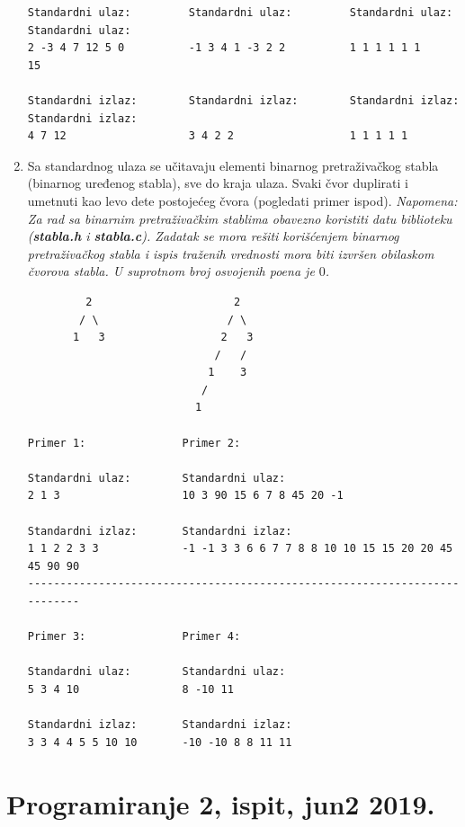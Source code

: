 \begin{enumerate}
\begin{verbatim}
Standardni ulaz:         Standardni ulaz:         Standardni ulaz:         Standardni ulaz:         
2 -3 4 7 12 5 0          -1 3 4 1 -3 2 2          1 1 1 1 1 1              15

Standardni izlaz:        Standardni izlaz:        Standardni izlaz:        Standardni izlaz:        
4 7 12                   3 4 2 2                  1 1 1 1 1
\end{verbatim}  

\item Sa standardnog ulaza se učitavaju elementi binarnog pretraživačkog stabla (binarnog uređenog stabla), 
      sve do kraja ulaza. Svaki čvor duplirati i umetnuti kao levo dete postojećeg čvora (pogledati primer ispod).
      \textit{Napomena: Za rad sa binarnim pretraživačkim stablima obavezno koristiti datu biblioteku (\textbf{stabla.h} i \textbf{stabla.c}). Zadatak se mora rešiti korišćenjem binarnog pretraživačkog stabla i ispis traženih vrednosti mora biti izvršen obilaskom čvorova stabla. U suprotnom broj osvojenih poena je $0$.}

\begin{verbatim}
         2                      2
        / \                    / \  
       1   3                  2   3
                             /   /
                            1    3 
                           /
                          1

Primer 1:               Primer 2:                

Standardni ulaz:        Standardni ulaz:         
2 1 3                   10 3 90 15 6 7 8 45 20 -1           

Standardni izlaz:       Standardni izlaz:        
1 1 2 2 3 3             -1 -1 3 3 6 6 7 7 8 8 10 10 15 15 20 20 45 45 90 90
---------------------------------------------------------------------------

Primer 3:               Primer 4:

Standardni ulaz:        Standardni ulaz:
5 3 4 10                8 -10 11

Standardni izlaz:       Standardni izlaz:
3 3 4 4 5 5 10 10       -10 -10 8 8 11 11         
\end{verbatim}  

\end{enumerate}

\section{Programiranje 2, ispit, jun2 2019.}

